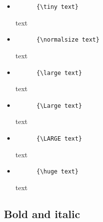 \documentclass[a4paper,12pt]{article}
\begin{document}
\begin{itemize}
  \renewcommand\labelitemi{}
  \item
  \begin{minipage}[t]{.46\linewidth}
    \begin{verbatim}
      {\tiny text}
    \end{verbatim}
  \end{minipage} \hfill
  \begin{minipage}[t]{.46\linewidth}
    {\tiny text}
  \end{minipage}
  \item
  \begin{minipage}[t]{.46\linewidth}
    \begin{verbatim}
      {\normalsize text}
    \end{verbatim}
  \end{minipage} \hfill
  \begin{minipage}[t]{.46\linewidth}
    {\normalsize text}
  \end{minipage}
  \item
  \begin{minipage}[t]{.46\linewidth}
    \begin{verbatim}
      {\large text}
    \end{verbatim}
  \end{minipage} \hfill
  \begin{minipage}[t]{.46\linewidth}
    {\large text}
  \end{minipage}
  \item
  \begin{minipage}[t]{.46\linewidth}
    \begin{verbatim}
      {\Large text}
    \end{verbatim}
  \end{minipage} \hfill
  \begin{minipage}[t]{.46\linewidth}
    {\Large text}
  \end{minipage}
  \item
  \begin{minipage}[t]{.46\linewidth}
    \begin{verbatim}
      {\LARGE text}
    \end{verbatim}
  \end{minipage} \hfill
  \begin{minipage}[t]{.46\linewidth}
    {\LARGE text}
  \end{minipage}
  \item
  \begin{minipage}[t]{.46\linewidth}
    \begin{verbatim}
      {\huge text}
    \end{verbatim}
  \end{minipage} \hfill
  \begin{minipage}[t]{.46\linewidth}
    {\huge text}
  \end{minipage}
\end{itemize}

\subsection{Bold and italic}
%
\end{document}

